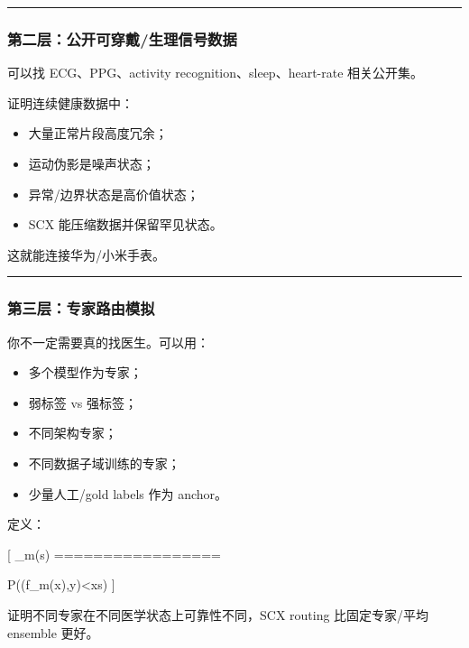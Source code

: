 \documentclass[
  12pt,
]{ctexart}
\providecommand{\tightlist}{%
  \setlength{\itemsep}{0pt}\setlength{\parskip}{0pt}}
\begin{document}
\begin{center}\rule{0.5\linewidth}{0.5pt}\end{center}

\subsubsection{第二层：公开可穿戴/生理信号数据}\label{ux7b2cux4e8cux5c42ux516cux5f00ux53efux7a7fux6234ux751fux7406ux4fe1ux53f7ux6570ux636e}

可以找 ECG、PPG、activity recognition、sleep、heart-rate 相关公开集。

证明连续健康数据中：

\begin{itemize}
\tightlist
\item
  大量正常片段高度冗余；
\item
  运动伪影是噪声状态；
\item
  异常/边界状态是高价值状态；
\item
  SCX 能压缩数据并保留罕见状态。
\end{itemize}

这就能连接华为/小米手表。

\begin{center}\rule{0.5\linewidth}{0.5pt}\end{center}

\subsubsection{第三层：专家路由模拟}\label{ux7b2cux4e09ux5c42ux4e13ux5bb6ux8defux7531ux6a21ux62df}

你不一定需要真的找医生。可以用：

\begin{itemize}
\tightlist
\item
  多个模型作为专家；
\item
  弱标签 vs 强标签；
\item
  不同架构专家；
\item
  不同数据子域训练的专家；
\item
  少量人工/gold labels 作为 anchor。
\end{itemize}

定义：

{[} \_m(s) =================

P(\ell(f\_m(x),y)\textless{}\tau\mid x\in s) {]}

证明不同专家在不同医学状态上可靠性不同，SCX routing 比固定专家/平均
ensemble 更好。
\end{document}
